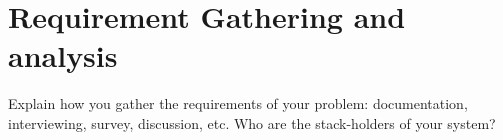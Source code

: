 \section{Requirement Gathering and analysis}\label{sec:rga}
Explain how you gather the requirements of your problem: documentation, interviewing, survey, discussion, etc. 
Who are the stack-holders of your system?
\clearpage